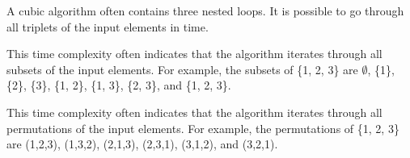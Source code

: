 \par {} A cubic algorithm often contains three nested loops. It is possible to go through all triplets of the input elements in  time.

\par {} This time complexity often indicates that the algorithm iterates through all subsets of the input elements. For example, the subsets of \{1, 2, 3\} are $\emptyset$, \{1\}, \{2\}, \{3\}, \{1, 2\}, \{1, 3\}, \{2, 3\}, and \{1, 2, 3\}.

\par {} This time complexity often indicates that the algorithm iterates through all permutations of the input elements. For example, the permutations of \{1, 2, 3\} are (1,2,3), (1,3,2), (2,1,3), (2,3,1), (3,1,2), and (3,2,1).
